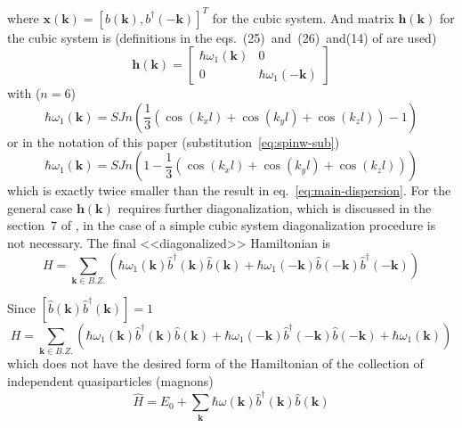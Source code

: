 \documentclass[a4paper,12pt]{article}
\begin{document}
        where $\mathbf{x}(\mathbf{k}) = [b(\mathbf{k}), b^{\dag}(-\mathbf{k})]^T$ for the cubic system. 
        And matrix $\mathbf{h}(\mathbf{k})$ for the cubic system is (definitions in the eqs.~(25)~and~(26)~and(14) of \cite{toth2015linear} are used)
        \begin{equation}
            \mathbf{h}(\mathbf{k}) = 
            \begin{bmatrix}
                \hbar\omega_1(\mathbf{k}) & 0 \\
                0 & \hbar\omega_1(-\mathbf{k})
            \end{bmatrix}
        \end{equation}
        with ($n = 6$)
        \begin{equation}
            \hbar\omega_1(\mathbf{k}) = SJn\left(\dfrac{1}{3}\left(\cos(k_xl) + \cos(k_yl) + \cos(k_zl)\right) - 1\right)
        \end{equation}
        or in the notation of this paper (substitution~\eqref{eq:spinw-sub})
        \begin{equation}
            \hbar\omega_1(\mathbf{k}) = SJn\left(1 - \dfrac{1}{3}\left(\cos(k_xl) + \cos(k_yl) + \cos(k_zl)\right)\right)
        \end{equation}
        which is exactly twice smaller than the result in eq.~\eqref{eq:main-dispersion}.
        For the general case $\mathbf{h}(\mathbf{k})$ requires further diagonalization, which is discussed in the section~$7$ of \cite{toth2015linear}, 
        in the case of a simple cubic system diagonalization procedure is not necessary.
        The final <<diagonalized>> Hamiltonian is 
        \begin{equation}
            H = \sum_{\mathbf{k} \in B.Z.}\left(\hbar\omega_1(\mathbf{k})\hat{b}^{\dag}(\mathbf{k})\hat{b}(\mathbf{k}) + \hbar\omega_1(-\mathbf{k})\hat{b}(\mathbf{-k})\hat{b}^{\dag}(\mathbf{-k})\right)
        \end{equation}

        Since $[\hat{b}(\mathbf{k})\hat{b}^{\dag}(\mathbf{k})] = 1$
        \begin{equation}
            H = \sum_{\mathbf{k} \in B.Z.}\left(\hbar\omega_1(\mathbf{k})\hat{b}^{\dag}(\mathbf{k})\hat{b}(\mathbf{k}) + \hbar\omega_1(-\mathbf{k})\hat{b}^{\dag}(\mathbf{-k})\hat{b}(\mathbf{-k}) + \hbar\omega_1(\mathbf{k})\right)
            \label{eq:spinw-cub}
        \end{equation}
        which does not have the desired form of the Hamiltonian of the collection of independent quasiparticles (magnons)
        \begin{equation}
            \hat{H} = E_0 + \sum_{\mathbf{k}}\hbar\omega(\mathbf{k})\hat{b}^{\dag}(\mathbf{k})\hat{b}(\mathbf{k})\label{eq:desired-form}
        \end{equation}
    
\end{document}
